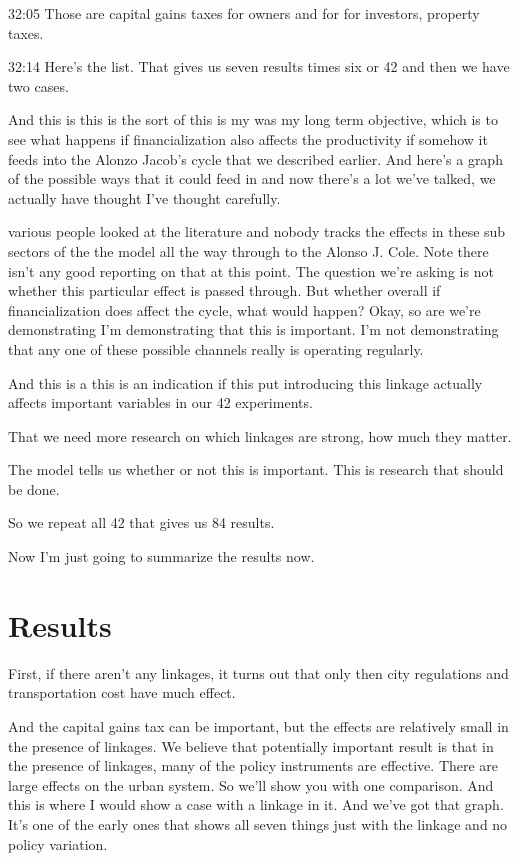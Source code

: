 \documentclass[]{article}
\begin{document}
32:05
Those are capital gains taxes for owners and for for investors, property taxes.

32:14
Here's the list.
That gives us seven results times six or 42 and then we have two cases. 

And this is this is the sort of this is my was my long term objective, which is to see what happens if financialization also affects the productivity if somehow it feeds into the Alonzo Jacob's cycle that we described earlier. And here's a graph of the possible ways that it could feed in and now there's a lot we've talked, we actually have thought I've thought carefully. 

various people looked at the literature and nobody tracks the effects in these sub sectors of the the model all the way through to the Alonso J. Cole. Note there isn't any good reporting on that at this point. The question we're asking is not whether this particular effect is passed through. But whether overall if financialization does affect the cycle, what would happen? Okay, so are we're demonstrating I'm demonstrating that this is important. I'm not demonstrating that any one of these possible channels really is operating regularly.

And this is a this is an indication if this put introducing this linkage actually affects important variables in our 42 experiments.

That we need more research on which linkages are strong, how much they matter.

The model tells us whether or not this is important. This is research that should be done.

So we repeat all 42 that gives us 84 results.

Now I'm just going to summarize the results now.

\section{Results}

First, if there aren't any linkages, it turns out that only then city regulations and transportation cost have much effect.

And the capital gains tax can be important, but the effects are relatively small in the presence of linkages. We believe that potentially important result is that in the presence of linkages, many of the policy instruments are effective.
There are large effects on the urban system. So we'll show you with one comparison. And this is where I would show a case with a linkage in it. And we've got that graph. It's one of the early ones that shows all seven things just with the linkage and no policy variation. 
\end{document}
